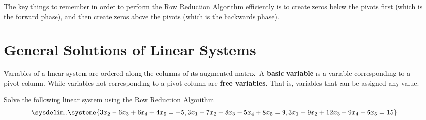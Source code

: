 \begin{note}
  \label{nte:backward_phase}

  The key things to remember in order to perform the Row Reduction Algorithm
  efficiently is to create zeros below the pivots first (which is the forward
  phase), and then create zeros above the pivots (which is the backwards phase).
\end{note}



\section{General Solutions of Linear Systems}
\label{sec:general_solutions_of_linear_systems}

\begin{definition}
  \label{def:basic_and_free_variables}

  Variables of a linear system are ordered along the columns of its augmented
  matrix. A \textbf{basic variable} is a variable corresponding to a pivot
  column. While variables not corresponding to a pivot column are \textbf{free
  variables}. That is, variables that can be assigned any value.
\end{definition}

\begin{question}
  \label{qst:basic_and_free_variables}

  Solve the following linear system using the Row Reduction Algorithm
  \[%
    \sysdelim..\systeme{
      3x_2 - 6x_3 + 6x_4 + 4x_5 = -5,
      3x_1 - 7x_2 + 8x_3 - 5x_4 + 8x_5 = 9,
      3x_1 - 9x_2 + 12x_3 - 9x_4 + 6x_5 = 15
    }
  .\]%
\end{question}

